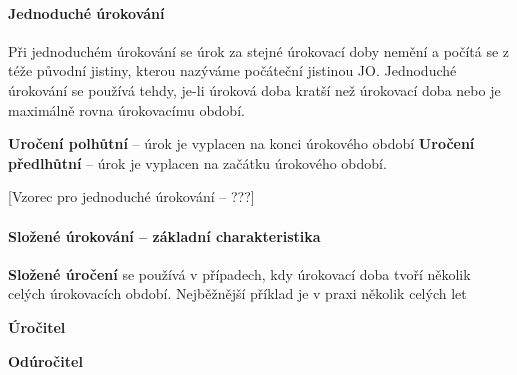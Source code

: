 \paragraph{Jednoduché úrokování}
Při jednoduchém úrokování se úrok za stejné úrokovací doby nemění a počítá se z téže původní jistiny, kterou nazýváme počáteční jistinou JO. Jednoduché úrokování se používá tehdy, je-li úroková doba kratší než úrokovací doba nebo je maximálně rovna úrokovacímu období.

\textbf{Uročení polhůtní} -- úrok je vyplacen na konci úrokového období
\textbf{Uročení předlhůtní} -- úrok je vyplacen na začátku úrokového období.

[Vzorec pro jednoduché úrokování -- ???]

\paragraph{Složené úrokování -- základní charakteristika}

\textbf{Složené úročení} se používá v případech, kdy úrokovací doba tvoří několik celých úrokovacích
období. Nejběžnější příklad je v praxi několik celých let

\textbf{Úročitel}

\textbf{Odúročitel}
